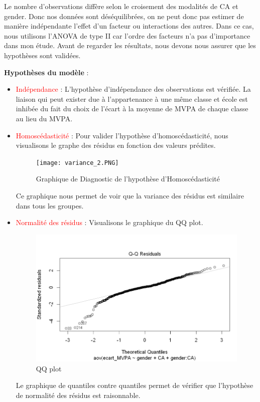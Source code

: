 \documentclass[12pt,a4paper]{article}
\begin{document}
	Le nombre d’observations diffère selon le croisement des modalités de CA et gender. Donc nos données sont déséquilibrées, on ne peut donc pas estimer de manière indépendante l’effet d’un facteur ou interactions des autres. Dans ce cas, nous utilisons l'ANOVA de type II car l'ordre des facteurs n'a pas d'importance dans mon étude. Avant de regarder les résultats, nous devons nous assurer que les hypothèses sont validées.
	
	\textbf{Hypothèses du modèle} :
	\begin{itemize}
		\item \textcolor{red}{Indépendance} : L'hypothèse d'indépendance des observations est vérifiée. La liaison qui peut exister due à l'appartenance à une même classe et école est inhibée du fait du choix de l'écart à la moyenne de MVPA de chaque classe au lieu du MVPA.
		\item \textcolor{red}{Homoscédasticité} : 
		Pour valider l'hypothèse d'homoscédasticité, nous visualisons le graphe des résidus en fonction des valeurs prédites.
		\begin{figure}[H]
			\centering
			\texttt{[image: variance\_2.PNG]}
			\caption{Graphique de Diagnostic de l'hypothèse d'Homoscédasticité}
			\label{fig:variance2}
		\end{figure}
		Ce graphique nous permet de voir que la variance des résidus est similaire dans tous les groupes.
		\item \textcolor{red}{Normalité des résidus} : 
		Visualisons le graphique du QQ plot.
		\begin{figure}[H]
			\centering
			\includegraphics[width=\linewidth]{Normalité_2.PNG}
			\caption{QQ plot}
			\label{fig:qq_plot2}
		\end{figure}
		Le graphique de quantiles contre quantiles permet de vérifier que l'hypothèse de normalité des résidus est raisonnable.
	\end{itemize}
\end{document}
